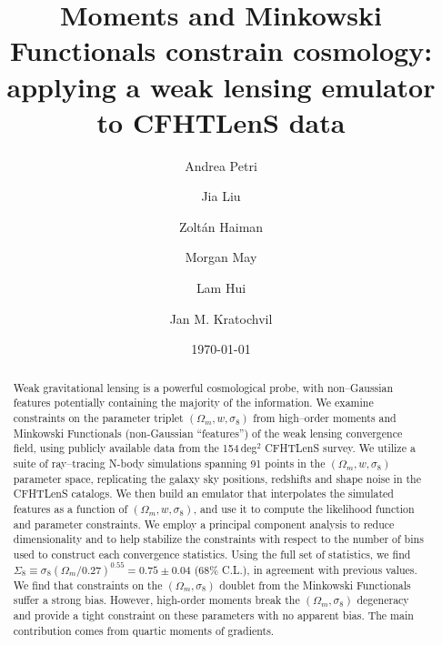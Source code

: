 \documentclass[reprint,aps,prd,superscriptaddress,showkeys,showpacs]{revtex4-1}
\begin{document}
\title{Moments and Minkowski Functionals constrain cosmology: applying a weak lensing emulator to CFHTLenS data}

\author{Andrea Petri}

\author{Jia Liu}

\author{Zolt\'an Haiman}

\author{Morgan May}

\author{Lam Hui}

\author{Jan M. Kratochvil}

\date{\today}

\label{firstpage}

\begin{abstract}
Weak gravitational lensing is a powerful cosmological probe, with
non--Gaussian features potentially containing the majority of the
information. We examine constraints on the parameter triplet
$(\Omega_m,w,\sigma_8)$ from high--order moments and Minkowski
Functionals (non-Gaussian ``features'') of the weak lensing
convergence field, using publicly available data from the 154\,deg$^2$
CFHTLenS survey. We utilize a suite of ray--tracing N-body simulations
spanning 91 points in the $(\Omega_m,w,\sigma_8)$ parameter space,
replicating the galaxy sky positions, redshifts and shape noise in the
CFHTLenS catalogs. We then build an emulator that interpolates the
simulated features as a function of $(\Omega_m,w,\sigma_8)$, and use
it to compute the likelihood function and parameter constraints. We
employ a principal component analysis to reduce dimensionality and to
help stabilize the constraints with respect to the number of bins used
to construct each convergence statistics. Using the full set of
statistics, we find
$\Sigma_8\equiv\sigma_8(\Omega_m/0.27)^{0.55}=0.75\pm0.04$ (68\%
C.L.), in agreement with previous values. We find that constraints on
the $(\Omega_m,\sigma_8)$ doublet from the Minkowski Functionals
suffer a strong bias. However, high-order moments break the
$(\Omega_m,\sigma_8)$ degeneracy and provide a tight constraint on
these parameters with no apparent bias.  The main contribution comes
from quartic moments of gradients.

\end{abstract}
\end{document}
